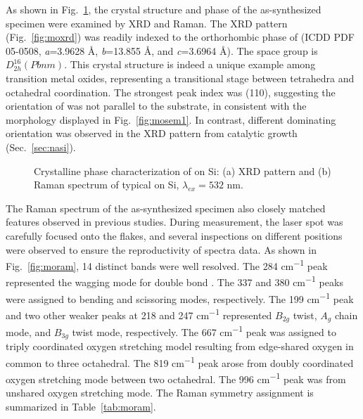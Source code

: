 As shown in Fig.~\ref{fig:mooxch}, the crystal structure and phase of the as-synthesized specimen were examined by XRD and Raman. The XRD pattern (Fig.~\ref{fig:moxrd}) was readily indexed to the orthorhombic phase of  (ICDD PDF 05-0508, \emph{a}=3.9628 \AA, \emph{b}=13.855 \AA, and \emph{c}=3.6964 \AA). The space group is $D_{2h}^{16}(Pbnm)$. This crystal structure is indeed a unique example among transition metal oxides, representing a transitional stage between tetrahedra and octahedral coordination.\cite{Itoh2001a} The strongest peak index was (110), suggesting the orientation of  was not parallel to the substrate, in consistent with the morphology displayed in Fig.~\ref{fig:mosem1}. In contrast, different dominating orientation was observed in the XRD pattern from catalytic growth (Sec.~\ref{sec:nasi}).
\begin{figure}[htb]
\centering
{}\hspace{0.04\textwidth}
\caption[Crystalline phase characterization of  on Si]{Crystalline phase characterization of  on Si: (a) XRD pattern and (b) Raman spectrum of typical  on Si, $\lambda_{ex} = 532$ nm.}
\label{fig:mooxch}
\end{figure}
The Raman spectrum of the as-synthesized specimen also closely matched  features observed in previous studies.\cite{Dixit1986,Silveira2012} During measurement, the laser spot was carefully focused onto the  flakes, and several inspections on different positions were observed to ensure the reproductivity of spectra data. As shown in Fig.~\ref{fig:moram}, 14 distinct bands were well resolved. The 284 \si{cm^{-1}} peak represented the wagging mode for double bond . The 337 and 380  \si{cm^{-1}} peaks were assigned to  bending and scissoring modes, respectively. The 199 \si{cm^{-1}} peak and two other weaker peaks at 218 and 247 \si{cm^{-1}} represented  $B_{2g}$ twist, $A_g$ chain mode, and  $B_{3g}$ twist mode, respectively. The 667 \si{cm^{-1}} peak was assigned to triply coordinated oxygen stretching model resulting from edge-shared oxygen in common to three octahedral. The 819 \si{cm^{-1}} peak arose from doubly coordinated oxygen stretching mode between two octahedral. The 996 \si{cm^{-1}} peak was from unshared oxygen stretching mode.\cite{Siciliano2009} The Raman symmetry assignment is summarized in Table~\ref{tab:moram}.
